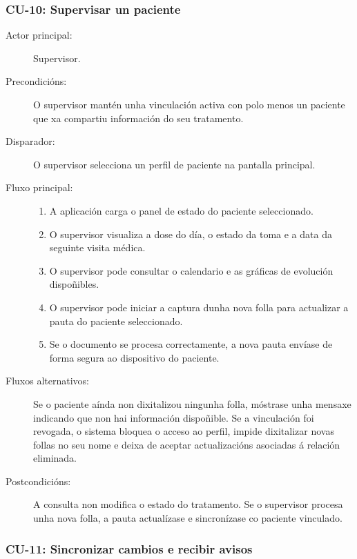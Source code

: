 \subsubsection{CU-10: Supervisar un paciente}

\begin{description}
    \item[Actor principal:] Supervisor.

    \item[Precondicións:] O supervisor mantén unha vinculación activa con polo menos un paciente que xa compartiu información do seu tratamento.

    \item[Disparador:] O supervisor selecciona un perfil de paciente na pantalla principal.

    \item[Fluxo principal:] \hfill
    \begin{enumerate}
        \item A aplicación carga o panel de estado do paciente seleccionado.
        \item O supervisor visualiza a dose do día, o estado da toma e a data da seguinte visita médica.
        \item O supervisor pode consultar o calendario e as gráficas de evolución dispoñibles.
        \item O supervisor pode iniciar a captura dunha nova folla para actualizar a pauta do paciente seleccionado.
        \item Se o documento se procesa correctamente, a nova pauta envíase de forma segura ao dispositivo do paciente.
    \end{enumerate}

    \item[Fluxos alternativos:] Se o paciente aínda non dixitalizou ningunha folla, móstrase unha mensaxe indicando que non hai información dispoñible. Se a vinculación foi revogada, o sistema bloquea o acceso ao perfil, impide dixitalizar novas follas no seu nome e deixa de aceptar actualizacións asociadas á relación eliminada.

    \item[Postcondicións:] A consulta non modifica o estado do tratamento. Se o supervisor procesa unha nova folla, a pauta actualízase e sincronízase co paciente vinculado.
\end{description}

\subsubsection{CU-11: Sincronizar cambios e recibir avisos}

